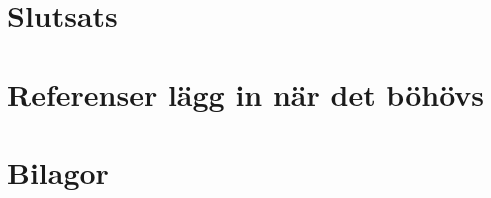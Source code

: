 \documentclass{article}
\begin{document}
\section{Slutsats}
\section{Referenser lägg in när det böhövs}


\section{Bilagor}
\end{document}
